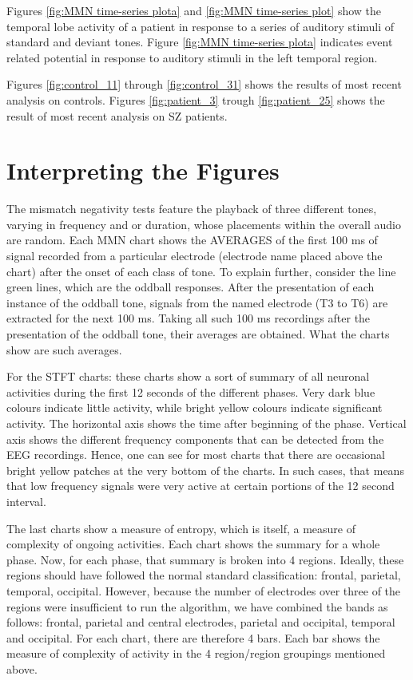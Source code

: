 \documentclass[10pt]{article}
\begin{document}
Figures \ref{fig:MMN time-series plota} and \ref{fig:MMN time-series plot} show the temporal lobe activity of a patient in response to a series of auditory stimuli of standard and deviant tones.
Figure \ref{fig:MMN time-series plota} indicates event related potential in response to auditory stimuli in the left temporal region.

Figures \ref{fig:control_11} through \ref{fig:control_31} shows the results of most recent analysis on controls.
Figures \ref{fig:patient_3} trough \ref{fig:patient_25} shows the result of most recent analysis on SZ patients.

\section{Interpreting the Figures}
The mismatch negativity tests feature the playback of three different tones, varying in frequency and or duration, whose placements within the overall audio are random. Each MMN chart shows the AVERAGES of the first 100 ms of signal recorded from a particular electrode (electrode name placed above the chart) after the onset of each class of tone. To explain further, consider the line green lines, which are the oddball responses. After the presentation of each instance of the oddball tone, signals from the named electrode (T3 to T6) are extracted for the next 100 ms. Taking all such 100 ms recordings after the presentation of the oddball tone, their averages are obtained. What the charts show are such averages.


For the STFT charts: these charts show a sort of summary of all neuronal activities during the first 12 seconds of the different phases. Very dark blue colours indicate little activity, while bright yellow colours indicate significant activity. The horizontal axis shows the time after beginning of the phase. Vertical axis shows the different frequency components that can be detected from the EEG recordings. Hence, one can see for most charts that there are occasional bright yellow patches at the very bottom of the charts. In such cases, that means that low frequency signals were very active at certain portions of the 12 second interval. 

The last charts show a measure of entropy, which is itself, a measure of complexity of ongoing activities. Each chart shows the summary for a whole phase. Now, for each phase, that summary is broken into 4 regions. Ideally, these regions should have followed the normal standard classification: frontal, parietal, temporal, occipital. However, because the number of electrodes over three of the regions were insufficient to run the algorithm, we have combined the bands as follows: frontal, parietal and central electrodes, parietal and occipital, temporal and occipital. For each chart, there are therefore 4 bars. Each bar shows the measure of complexity of activity in the 4 region/region groupings mentioned above.
\end{document}
